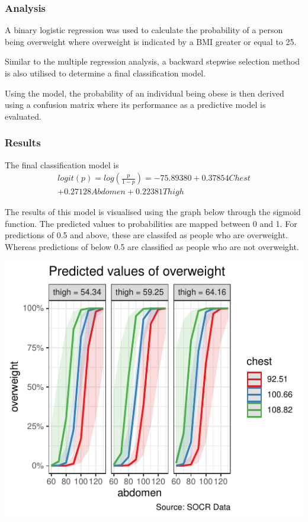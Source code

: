 \documentclass[a4paper,9pt,twocolumn,twoside,]{pinp}
\begin{document}
\hypertarget{analysis-2}{%
\subsubsection{Analysis}\label{analysis-2}}

A binary logistic regression was used to calculate the probability of a
person being overweight where overweight is indicated by a BMI greater
or equal to 25.

Similar to the multiple regression analysis, a backward stepwise
selection method is also utilised to determine a final classification
model.

Using the model, the probability of an individual being obese is then
derived using a confusion matrix where its performance as a predictive
model is evaluated.

\hypertarget{results-1}{%
\subsubsection{Results}\label{results-1}}

The final classification model is \[
\begin{aligned}
logit(p)=log(\frac{p}{1-p})=-75.89380+0.37854Chest\\ +0.27128Abdomen+0.22381Thigh
\end{aligned}
\]

The results of this model is visualised using the graph below through
the sigmoid function. The predicted values to probabilities are mapped
between 0 and 1. For predictions of 0.5 and above, these are classifed
as people who are overweight. Whereas predictions of below 0.5 are
classified as people who are not overweight.

\begin{center}\includegraphics{Executive-Report_files/figure-latex/unnamed-chunk-2-1} \end{center}
\end{document}
